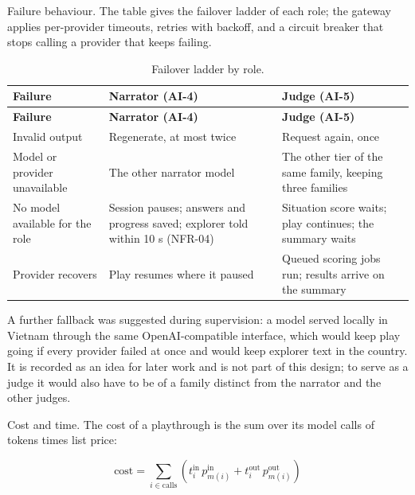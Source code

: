 Failure behaviour. The table gives the failover ladder of each role; the gateway applies per-provider timeouts, retries with backoff, and a circuit breaker that stops calling a provider that keeps failing.

{\small
\begin{longtable}{|>{\raggedright\arraybackslash}p{}|>{\raggedright\arraybackslash}p{}|>{\raggedright\arraybackslash}p{}|}
\caption{Failover ladder by role.} \\
\hline
\textbf{Failure} & \textbf{Narrator (AI-4)} & \textbf{Judge (AI-5)} \\ \hline
\endfirsthead
\hline
\textbf{Failure} & \textbf{Narrator (AI-4)} & \textbf{Judge (AI-5)} \\ \hline
\endhead
Invalid output & Regenerate, at most twice & Request again, once \\ \hline
Model or provider unavailable & The other narrator model & The other tier of the same family, keeping three families \\ \hline
No model available for the role & Session pauses; answers and progress saved; explorer told within 10 s (NFR-04) & Situation score waits; play continues; the summary waits \\ \hline
Provider recovers & Play resumes where it paused & Queued scoring jobs run; results arrive on the summary \\ \hline
\end{longtable}
}

A further fallback was suggested during supervision: a model served locally in Vietnam through the same OpenAI-compatible interface, which would keep play going if every provider failed at once and would keep explorer text in the country. It is recorded as an idea for later work and is not part of this design; to serve as a judge it would also have to be of a family distinct from the narrator and the other judges.

Cost and time. The cost of a playthrough is the sum over its model calls of tokens times list price:

\begin{equation}
\text{cost} = \sum_{i \in \text{calls}} \left( t^{\text{in}}_i\, p^{\text{in}}_{m(i)} + t^{\text{out}}_i\, p^{\text{out}}_{m(i)} \right)
\end{equation}

